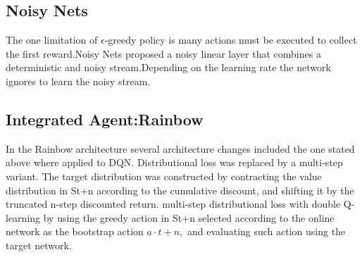 
  

\subsection{Noisy Nets}

The one limitation of $\mathcal{\epsilon}$-greedy policy  is many actions must be executed to collect the first reward.Noisy Nets proposed a noisy linear layer that combines  a deterministic and noisy stream.Depending on the learning rate the network ignores to learn the noisy stream.

\subsection{Integrated Agent:Rainbow}


In the Rainbow architecture \cite{rainbow} 
several architecture changes included the one stated above where applied to DQN.
Distributional loss was replaced by a multi-step variant. The target
distribution was constructed  by contracting the value distribution
in St+n according to the cumulative discount, 
and shifting it by the truncated n-step discounted return. 
multi-step distributional loss with double Q-learning by using the greedy action in St+n 
selected according to the online network as the bootstrap action $a \cdot t+n,$ and evaluating such action using the target network.




